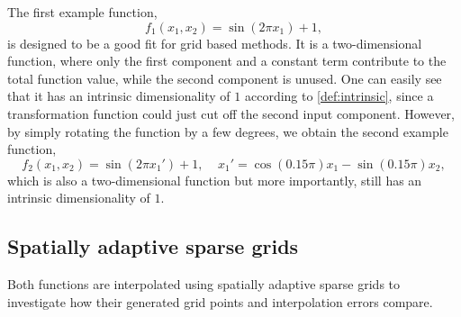 \documentclass[
  a4paper,  %
  twoside,  %
  bibliography=totoc,
  headsepline,
  cleardoublepage=empty,
  parskip=half,
  draft=false
]{scrbook}
\begin{document}
The first example function,
\begin{equation}
f_1(x_1, x_2)=\sin(2 \pi x_1) + 1,
\end{equation}
 is designed to be a good fit for grid based methods.
It is a two-dimensional function, where only the first component and a constant term contribute to the total function value, while the second component is unused.
One can easily see that it has an intrinsic dimensionality of $1$ according to \cref{def:intrinsic}, since a transformation function could just cut off the second input component.
However, by simply rotating the function by a few degrees, we obtain the second example function,
\begin{equation}
f_2(x_1,x_2)=\sin(2 \pi x_1') + 1, ~~~~~ x_1'=\cos(0.15 \pi) x_1 -\sin(0.15 \pi) x_2,
\end{equation}
which is also a two-dimensional function but more importantly, still has an intrinsic dimensionality of $1$.

\subsection{Spatially adaptive sparse grids}

Both functions are interpolated using spatially adaptive sparse grids to investigate how their generated grid points and interpolation errors compare.
\end{document}
